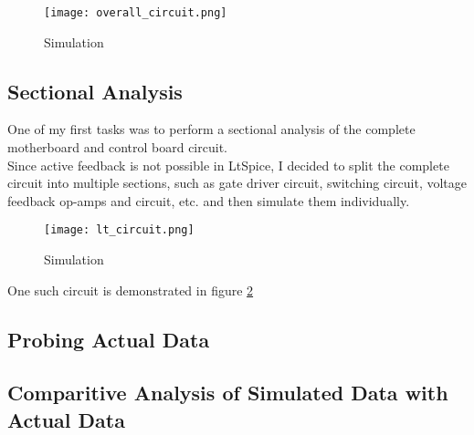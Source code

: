 \begin{figure}[H]
    \centering
    \texttt{[image: overall\_circuit.png]}
    \caption{Simulation}
    \label{fig:Simulation1}
\end{figure}

\subsection{Sectional Analysis}
One of my first tasks was to perform a sectional analysis of the complete motherboard and control board circuit.\\
\noindent
Since active feedback is not possible in LtSpice, I decided to split the complete circuit into multiple sections, such as gate driver circuit, switching circuit, voltage feedback op-amps and circuit, etc. and then simulate them individually.\\
\begin{figure}[H]
    \centering
    \texttt{[image: lt\_circuit.png]}
    \caption{Simulation}
    \label{fig:lt_circuit}
\end{figure}

\noindent
One such circuit is demonstrated in figure \ref*{fig:lt_circuit}

\subsection{Probing Actual Data}


\subsection{Comparitive Analysis of Simulated Data with Actual Data}
